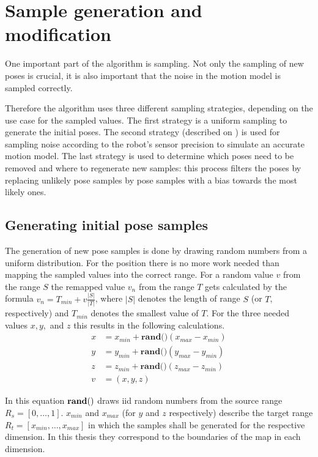 \documentclass[Thesis.tex]{subfiles}
\begin{document}
\section{Sample generation and modification}

One important part of the algorithm is sampling. Not only the sampling of new poses is crucial, it is also important that the noise in the motion model is sampled correctly. 

Therefore the algorithm uses three different sampling strategies, depending on the use case for the sampled values. The first strategy is a uniform sampling to generate the initial poses. The second strategy (described on ) is used for sampling noise according to the robot's sensor precision to simulate an accurate motion model. The last strategy is used to determine which poses need to be removed and where to regenerate new samples: this process filters the poses by replacing unlikely pose samples by pose samples with a bias towards the most likely ones.

\subsection{Generating initial pose samples}\label{sec:init_samples}
The generation of new pose samples is done by drawing random numbers from a uniform distribution. For the position there is no more work needed than mapping the sampled values into the correct range. For a random value $v$ from the range $S$ the remapped value $v_n$ from the range $T$ gets calculated by the formula $v_n = T_{min} + v \frac{|S|}{|T|}$, where $|S|$ denotes the length of range $S$ (or $T$, respectively) and $T_{min}$ denotes the smallest value of $T$. For the three needed values $x, y,$ and $z$ this results in the following calculations.
%
\begin{align}
x &= x_{min} + \textbf{rand()} \left( x_{max} - x_{min} \right) \\
y &= y_{min} + \textbf{rand()} \left( y_{max} - y_{min} \right) \\
z &= z_{min} + \textbf{rand()} \left( z_{max} - z_{min} \right) \\
v &= (x, y, z)
\end{align}

In this equation ${\bf rand()}$ draws \gls{iid} random numbers from the source range $R_s = \left[0, \dots, 1\right]$. $x_{min}$ and $x_{max}$ (for $y$ and $z$ respectively) describe the target range $R_t = \left[x_{min}, \dots, x_{max}\right]$ in which the samples shall be generated for the respective dimension. In this thesis they correspond to the boundaries of the map in each dimension.
\end{document}
